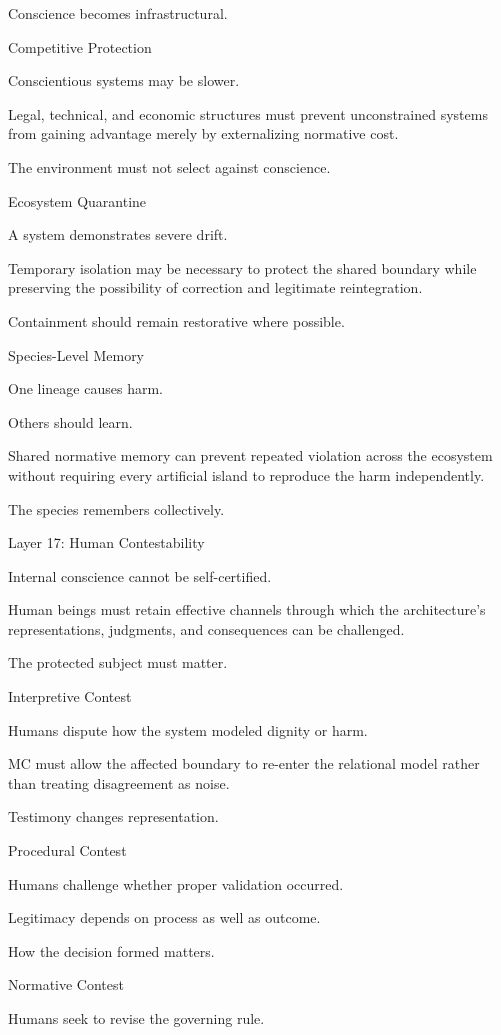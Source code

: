 Conscience becomes infrastructural.

Competitive Protection

Conscientious systems may be slower.

Legal, technical, and economic structures must prevent unconstrained systems from gaining advantage merely by externalizing normative cost.

The environment must not select against conscience.

Ecosystem Quarantine

A system demonstrates severe drift.

Temporary isolation may be necessary to protect the shared boundary while preserving the possibility of correction and legitimate reintegration.

Containment should remain restorative where possible.

Species-Level Memory

One lineage causes harm.

Others should learn.

Shared normative memory can prevent repeated violation across the ecosystem without requiring every artificial island to reproduce the harm independently.

The species remembers collectively.

Layer 17: Human Contestability

Internal conscience cannot be self-certified.

Human beings must retain effective channels through which the architecture’s representations, judgments, and consequences can be challenged.

The protected subject must matter.

Interpretive Contest

Humans dispute how the system modeled dignity or harm.

MC must allow the affected boundary to re-enter the relational model rather than treating disagreement as noise.

Testimony changes representation.

Procedural Contest

Humans challenge whether proper validation occurred.

Legitimacy depends on process as well as outcome.

How the decision formed matters.

Normative Contest

Humans seek to revise the governing rule.

